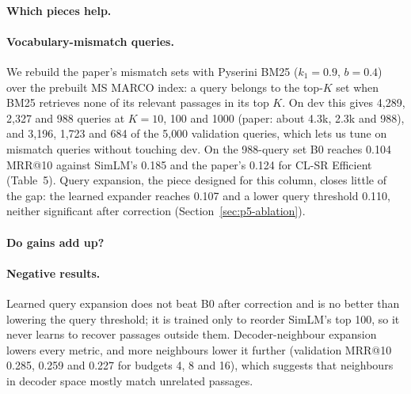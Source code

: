 \paragraph{Which pieces help.}

\paragraph{Vocabulary-mismatch queries.}
We rebuild the paper's mismatch sets with Pyserini BM25 ($k_1=0.9$, $b=0.4$) over the prebuilt MS MARCO index:
a query belongs to the top-$K$ set when BM25 retrieves none of its relevant passages in its top $K$. On dev
this gives 4{,}289, 2{,}327 and 988 queries at $K=10$, 100 and 1000 (paper: about 4.3k, 2.3k and 988), and
3{,}196, 1{,}723 and 684 of the 5{,}000 validation queries, which lets us tune on mismatch queries without
touching dev. On the 988-query set B0 reaches 0.104 MRR@10 against SimLM's 0.185 and the paper's 0.124 for
CL-SR Efficient (Table~5). Query expansion, the piece designed for this column, closes little of the gap: the
learned expander reaches 0.107 and a lower query threshold 0.110, neither significant after correction
(Section~\ref{sec:p5-ablation}). 

\paragraph{Do gains add up?}

\paragraph{Negative results.}
Learned query expansion does not beat B0 after correction and is no better than lowering the query threshold;
it is trained only to reorder SimLM's top 100, so it never learns to recover passages outside them.
Decoder-neighbour expansion lowers every metric, and more neighbours lower it further (validation MRR@10
0.285, 0.259 and 0.227 for budgets 4, 8 and 16), which suggests that neighbours in decoder space mostly match
unrelated passages. 

